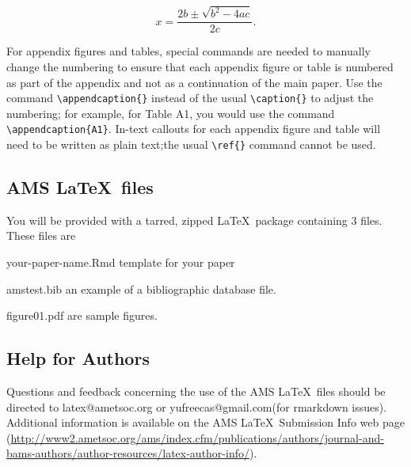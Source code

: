 \documentclass[draft]{ametsoc}
\begin{document}
\begin{equation}
\label{eq:1}
x=\frac{2b\pm\sqrt{b^{2}-4ac}}{2c}.  
\end{equation}

For appendix figures and tables, special commands are needed to manually
change the numbering to ensure that each appendix figure or table is
numbered as part of the appendix and not as a continuation of the main
paper. Use the command \texttt{\textbackslash{}appendcaption\{\}}
instead of the usual \texttt{\textbackslash{}caption\{\}} to adjust the
numbering; for example, for Table A1, you would use the command
\texttt{\textbackslash{}appendcaption\{A1\}}. In-text callouts for each
appendix figure and table will need to be written as plain text;the
usual \texttt{\textbackslash{}ref\{\}} command cannot be used.

\appendix[B]

\hypertarget{ams-files}{%
\subsection{\texorpdfstring{AMS
\LaTeX~files}{AMS ~files}}\label{ams-files}}

You will be provided with a tarred, zipped \LaTeX~package containing 3
files. These files are

\begin{description}

\item
  your-paper-name.Rmd template for your paper
\item
  amstest.bib an example of a bibliographic database file.
\item
  figure01.pdf are sample figures.

\end{description}

\hypertarget{help-for-authors}{%
\subsection{Help for Authors}\label{help-for-authors}}

Questions and feedback concerning the use of the AMS \LaTeX~files should
be directed to latex@ametsoc.org or yufreecas@gmail.com(for rmarkdown
issues). Additional information is available on the AMS
\LaTeX~Submission Info web page
(\url{http://www2.ametsoc.org/ams/index.cfm/publications/authors/journal-and-bams-authors/author-resources/latex-author-info/}).
\end{document}
